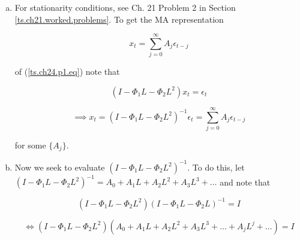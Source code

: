 \begin{enumerate}[(a)]

\item For stationarity conditions, see Ch. 21 Problem 2 in Section \ref{ts.ch21.worked.problems}. To get the MA representation

\begin{equation}  \label{ts.ch24.p1.ma}
x_t = \sum_{j=0}^\infty A_j \epsilon_{t-j}
\end{equation}

of (\ref{ts.ch24.p1.eq}) note that 

\[
(I - \Phi_1L - \Phi_2 L^2) x_t = \epsilon_t
\]

\[
\implies x_t = (I - \Phi_1L - \Phi_2 L^2)^{-1} \epsilon_t = \sum_{j=0}^\infty A_j \epsilon_{t-j}
\]

for some \(\{A_j\}\).

%
%
%
%
%
%
%
%
%

\item Now we seek to evaluate \((I - \Phi_1L - \Phi_2 L^2)^{-1}   \). To do this, let \((I - \Phi_1L - \Phi_2 L^2)^{-1} = A_0 + A_1L + A_2L^2  + A_3 L^3 + \ldots \) and note that

\[
(I - \Phi_1 L - \Phi_2 L^2)(I - \Phi_1L - \Phi_2 L)^{-1} = I
\]

\[
 \iff  (I - \Phi_1 L - \Phi_2 L^2)( A_0 + A_1L + A_2L^2 + A_3 L^3 + \ldots + A_j L^j + \ldots ) = I
\]


\end{enumerate}
